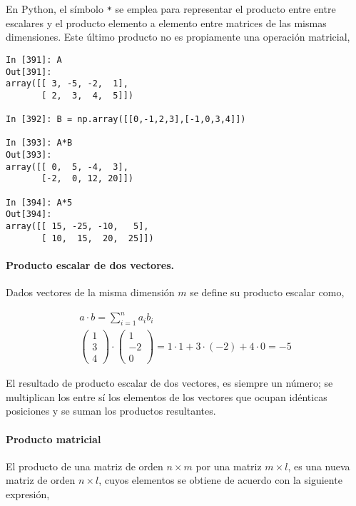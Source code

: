 \begin{paracol}{2}
En Python, el símbolo \texttt{*} se emplea para representar el producto entre entre escalares y el producto elemento a elemento entre matrices de las mismas dimensiones. Este último producto no es propiamente una operación matricial,
\end{paracol}

\begin{center}
    \begin{minipage}{0.5\textwidth}
        \begin{verbatim}
In [391]: A
Out[391]: 
array([[ 3, -5, -2,  1],
       [ 2,  3,  4,  5]])

In [392]: B = np.array([[0,-1,2,3],[-1,0,3,4]])

In [393]: A*B
Out[393]: 
array([[ 0,  5, -4,  3],
       [-2,  0, 12, 20]])

In [394]: A*5
Out[394]: 
array([[ 15, -25, -10,   5],
       [ 10,  15,  20,  25]])
        \end{verbatim}
    \end{minipage}
\end{center}

\begin{paracol}{2}
\paragraph{Producto escalar de dos vectores.} Dados vectores de la misma dimensión $m$ se define su producto escalar como,     
\end{paracol}


\begin{gather*}
a\cdot b=\sum_{i=1}^na_ib_i\\
\begin{pmatrix}
1\\
3\\
4
\end{pmatrix}\cdot
\begin{pmatrix}
1\\
-2\\
0
\end{pmatrix}
=1\cdot 1+3 \cdot (-2)+ 4 \cdot 0= -5
\end{gather*}
\begin{paracol}{2}
El resultado de producto escalar de dos vectores, es siempre un número; se multiplican los entre sí los elementos de los vectores que ocupan idénticas posiciones y se suman los productos resultantes. 

\paragraph{Producto matricial}
El producto de una matriz de orden $n\times m$ por una matriz $m\times l$, es una nueva matriz de orden $n\times l$, cuyos elementos se obtiene de acuerdo con la siguiente expresión,    
\end{paracol}


